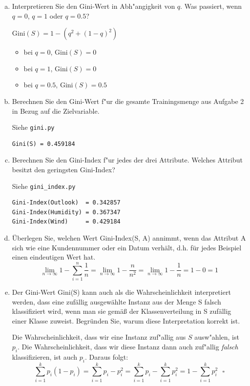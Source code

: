 \documentclass[10pt, oneside]{article}
\begin{document}
\begin{enumerate}[(a)]
    \item  Interpretieren Sie den Gini-Wert in Abh"angigkeit von $q$. Was
        passiert, wenn $q = 0$, $q = 1$ oder $q = 0.5$?

        $\text{Gini}(S) = 1 - (q^2 + (1 - q)^2)$
        \begin{itemize}
            \item bei $q = 0$, $\text{Gini}(S) = 0$
            \item bei $q = 1$, $\text{Gini}(S) = 0$
            \item bei $q = 0.5$, $\text{Gini}(S) = 0.5$
        \end{itemize}

    \item Berechnen Sie den Gini-Wert f"ur die gesamte Trainingsmenge aus
        Aufgabe 2 in Bezug auf die Zielvariable.

        Siehe \verb|gini.py|

\begin{verbatim}
Gini(S) = 0.459184
\end{verbatim}

    \item Berechnen Sie den Gini-Index f"ur jedes der drei Attribute. Welches
        Attribut besitzt den geringsten Gini-Index?

        Siehe \verb|gini_index.py|

\begin{verbatim}
Gini-Index(Outlook)  = 0.342857
Gini-Index(Humidity) = 0.367347
Gini-Index(Wind)     = 0.429184
\end{verbatim}

    \item Überlegen Sie, welchen Wert Gini-Index(S, A) annimmt, wenn das
        Attribut A sich wie eine Kundennummer oder ein Datum verhält, d.h. für
        jedes Beispiel einen eindeutigen Wert hat.
        \begin{equation*}
            \lim_{n \rightarrow \infty} 1 - \sum_{i = 1}^n\dfrac{1}{n} = \lim_{n \rightarrow \infty} 1 - \dfrac{n}{n^2} = \lim_{n \rightarrow \infty} 1 - \dfrac{1}{n} = 1 - 0 = 1
        \end{equation*}

    \item Der Gini-Wert Gini(S) kann auch als die Wahrscheinlichkeit interpretiert werden,
        dass eine zufällig ausgewählte Instanz aus der Menge S falsch klassifiziert
        wird, wenn man sie gemäß der Klassenverteilung in S zufällig einer Klasse
        zuweist. Begründen Sie, warum diese Interpretation korrekt ist.

        Die Wahrscheinlichkeit, dass wir eine Instanz zuf"allig aus $S$
        ausw"ahlen, ist $p_i$. Die Wahrscheinlichkeit, dass wir diese Instanz
        dann auch zuf"allig \textit{falsch} klassifizieren, ist auch $p_i$.
        Daraus folgt:
        \begin{equation*}
        \sum_{i = 1}^k p_i(1 - p_i) = \sum_{i = 1}^k p_i - p_i^2 = \sum_{i = 1}^k p_i - \sum_{i = 1}^k p_i^2 = 1 - \sum_{i = 1}^k p_i^2 \ \ \ \square
        \end{equation*}

\end{enumerate}
\end{document}
